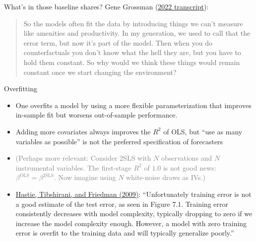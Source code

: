 \documentclass[11pt,notes=hide,aspectratio=169]{beamer}
\begin{document}
\begin{frame}{What's in those baseline shares?}
Gene Grossman (\href{https://economics.princeton.edu/news/alumni-conversations-gene-grossman-and-mits-david-atkin}{2022 transcript}):
\begin{quote}{
So the models often fit the data by introducing things we can't measure like amenities and productivity. In my generation, we used to call that the error term, but now it's part of the model. Then when you do counterfactuals you don't know what the hell they are, but you have to hold them constant. So why would we think these things would remain constant once we start changing the environment?
\par}\end{quote}
\end{frame}
\begin{frame}{Overfitting}
\begin{itemize}
\item
One overfits a model by using a more flexible parameterization that improves in-sample fit but worsens out-of-sample performance.
\item
Adding more covariates always improves the $R^2$ of OLS, but ``use as many variables as possible'' is not the preferred specification of forecasters 
\item[]
\textcolor{gray}{(Perhaps more relevant: Consider 2SLS with $N$ observations and $N$ instrumental variables. The first-stage $R^2$ of $1.0$ is not good news: $\beta^{\text{OLS}} = \beta^{\text{2SLS}}$. Now imagine using $N$ white-noise draws as IVs.)}
\item
\href{https://hastie.su.domains/ElemStatLearn/}{Hastie, Tibshirani, and Friedman (2009)}:
``Unfortunately training error is not a good estimate of the test error, as seen in Figure 7.1. Training error consistently decreases with model complexity, typically dropping to zero if we increase the model complexity enough. However, a model with zero training error is overfit to the training data and will typically generalize poorly.''
\end{itemize}
\end{frame}
\end{document}
